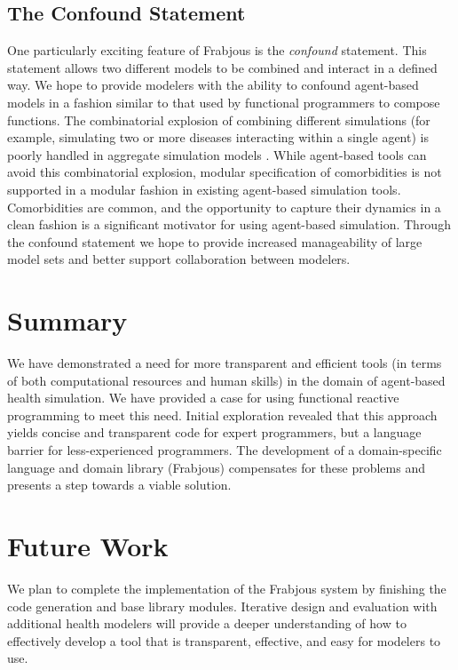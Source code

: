 \documentclass{sig-alternate}
\begin{document}
\subsection{The Confound Statement}
\label{sec:confound}
One particularly exciting feature of Frabjous is the \emph{confound} statement. This statement allows two different models to be combined and interact in a defined way. We hope to provide modelers with the ability to confound agent-based models in a fashion similar to that used by functional programmers to compose functions. The combinatorial explosion of combining different simulations (for example, simulating two or more diseases interacting within a single agent) is poorly handled in aggregate simulation models \cite{osgood_comorbidities}. While agent-based tools can avoid this combinatorial explosion, modular specification of comorbidities  is not supported in a modular fashion in existing agent-based simulation tools. Comorbidities are common, and the opportunity to capture their dynamics in a clean fashion is a significant motivator for using agent-based simulation. Through the confound statement we hope to provide increased manageability of large model sets and better support collaboration between modelers.



\section{Summary}

We have demonstrated a need for more transparent and efficient tools (in terms of both computational resources and human skills) in the domain of agent-based health simulation. We have provided a case for using functional reactive programming to meet this need. Initial exploration revealed that this approach yields concise and transparent code for expert programmers, but a language barrier for less-experienced programmers. The development of a domain-specific language and domain library (Frabjous) compensates for these problems and presents a step towards a viable solution.


\section{Future Work}

We plan to complete the implementation of the Frabjous system by finishing the code generation and base library modules. Iterative design and evaluation with additional health modelers will provide a deeper understanding of how to effectively develop a tool that is transparent, effective, and easy for modelers to use.
\end{document}
